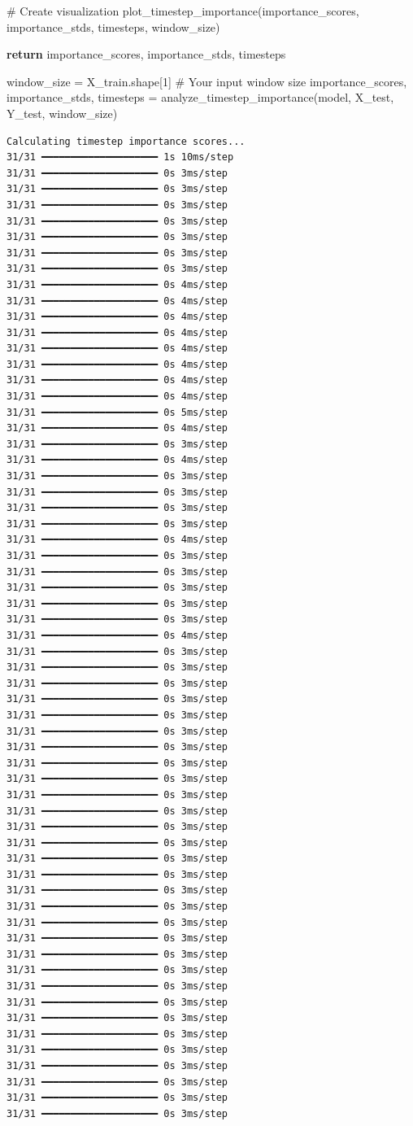 \documentclass[
  letterpaper,
  DIV=11,
  numbers=noendperiod]{scrreprt}
\newenvironment{Shaded}{\begin{snugshade}}{\end{snugshade}}
\newcommand{\CommentTok}[1]{\textcolor[rgb]{0.37,0.37,0.37}{#1}}
\newcommand{\ControlFlowTok}[1]{\textcolor[rgb]{0.00,0.23,0.31}{\textbf{#1}}}
\newcommand{\DecValTok}[1]{\textcolor[rgb]{0.68,0.00,0.00}{#1}}
\newcommand{\NormalTok}[1]{\textcolor[rgb]{0.00,0.23,0.31}{#1}}
\newcommand{\OperatorTok}[1]{\textcolor[rgb]{0.37,0.37,0.37}{#1}}
\begin{document}
\begin{Shaded}
\begin{Highlighting}[]
    \CommentTok{\# Create visualization}
\NormalTok{    plot\_timestep\_importance(importance\_scores, importance\_stds, timesteps, window\_size)}

    \ControlFlowTok{return}\NormalTok{ importance\_scores, importance\_stds, timesteps}

\NormalTok{window\_size }\OperatorTok{=}\NormalTok{ X\_train.shape[}\DecValTok{1}\NormalTok{]  }\CommentTok{\# Your input window size}
\NormalTok{importance\_scores, importance\_stds, timesteps }\OperatorTok{=}\NormalTok{ analyze\_timestep\_importance(model, X\_test, Y\_test, window\_size)}
\end{Highlighting}
\end{Shaded}

\begin{verbatim}
Calculating timestep importance scores...
31/31 ━━━━━━━━━━━━━━━━━━━━ 1s 10ms/step
31/31 ━━━━━━━━━━━━━━━━━━━━ 0s 3ms/step
31/31 ━━━━━━━━━━━━━━━━━━━━ 0s 3ms/step
31/31 ━━━━━━━━━━━━━━━━━━━━ 0s 3ms/step
31/31 ━━━━━━━━━━━━━━━━━━━━ 0s 3ms/step
31/31 ━━━━━━━━━━━━━━━━━━━━ 0s 3ms/step
31/31 ━━━━━━━━━━━━━━━━━━━━ 0s 3ms/step
31/31 ━━━━━━━━━━━━━━━━━━━━ 0s 3ms/step
31/31 ━━━━━━━━━━━━━━━━━━━━ 0s 4ms/step
31/31 ━━━━━━━━━━━━━━━━━━━━ 0s 4ms/step
31/31 ━━━━━━━━━━━━━━━━━━━━ 0s 4ms/step
31/31 ━━━━━━━━━━━━━━━━━━━━ 0s 4ms/step
31/31 ━━━━━━━━━━━━━━━━━━━━ 0s 4ms/step
31/31 ━━━━━━━━━━━━━━━━━━━━ 0s 4ms/step
31/31 ━━━━━━━━━━━━━━━━━━━━ 0s 4ms/step
31/31 ━━━━━━━━━━━━━━━━━━━━ 0s 4ms/step
31/31 ━━━━━━━━━━━━━━━━━━━━ 0s 5ms/step
31/31 ━━━━━━━━━━━━━━━━━━━━ 0s 4ms/step
31/31 ━━━━━━━━━━━━━━━━━━━━ 0s 3ms/step
31/31 ━━━━━━━━━━━━━━━━━━━━ 0s 4ms/step
31/31 ━━━━━━━━━━━━━━━━━━━━ 0s 3ms/step
31/31 ━━━━━━━━━━━━━━━━━━━━ 0s 3ms/step
31/31 ━━━━━━━━━━━━━━━━━━━━ 0s 3ms/step
31/31 ━━━━━━━━━━━━━━━━━━━━ 0s 3ms/step
31/31 ━━━━━━━━━━━━━━━━━━━━ 0s 4ms/step
31/31 ━━━━━━━━━━━━━━━━━━━━ 0s 3ms/step
31/31 ━━━━━━━━━━━━━━━━━━━━ 0s 3ms/step
31/31 ━━━━━━━━━━━━━━━━━━━━ 0s 3ms/step
31/31 ━━━━━━━━━━━━━━━━━━━━ 0s 3ms/step
31/31 ━━━━━━━━━━━━━━━━━━━━ 0s 3ms/step
31/31 ━━━━━━━━━━━━━━━━━━━━ 0s 4ms/step
31/31 ━━━━━━━━━━━━━━━━━━━━ 0s 3ms/step
31/31 ━━━━━━━━━━━━━━━━━━━━ 0s 3ms/step
31/31 ━━━━━━━━━━━━━━━━━━━━ 0s 3ms/step
31/31 ━━━━━━━━━━━━━━━━━━━━ 0s 3ms/step
31/31 ━━━━━━━━━━━━━━━━━━━━ 0s 3ms/step
31/31 ━━━━━━━━━━━━━━━━━━━━ 0s 3ms/step
31/31 ━━━━━━━━━━━━━━━━━━━━ 0s 3ms/step
31/31 ━━━━━━━━━━━━━━━━━━━━ 0s 3ms/step
31/31 ━━━━━━━━━━━━━━━━━━━━ 0s 3ms/step
31/31 ━━━━━━━━━━━━━━━━━━━━ 0s 3ms/step
31/31 ━━━━━━━━━━━━━━━━━━━━ 0s 3ms/step
31/31 ━━━━━━━━━━━━━━━━━━━━ 0s 3ms/step
31/31 ━━━━━━━━━━━━━━━━━━━━ 0s 3ms/step
31/31 ━━━━━━━━━━━━━━━━━━━━ 0s 3ms/step
31/31 ━━━━━━━━━━━━━━━━━━━━ 0s 3ms/step
31/31 ━━━━━━━━━━━━━━━━━━━━ 0s 3ms/step
31/31 ━━━━━━━━━━━━━━━━━━━━ 0s 3ms/step
31/31 ━━━━━━━━━━━━━━━━━━━━ 0s 3ms/step
31/31 ━━━━━━━━━━━━━━━━━━━━ 0s 3ms/step
31/31 ━━━━━━━━━━━━━━━━━━━━ 0s 3ms/step
31/31 ━━━━━━━━━━━━━━━━━━━━ 0s 3ms/step
31/31 ━━━━━━━━━━━━━━━━━━━━ 0s 3ms/step
31/31 ━━━━━━━━━━━━━━━━━━━━ 0s 3ms/step
31/31 ━━━━━━━━━━━━━━━━━━━━ 0s 3ms/step
31/31 ━━━━━━━━━━━━━━━━━━━━ 0s 3ms/step
31/31 ━━━━━━━━━━━━━━━━━━━━ 0s 3ms/step
31/31 ━━━━━━━━━━━━━━━━━━━━ 0s 3ms/step
31/31 ━━━━━━━━━━━━━━━━━━━━ 0s 3ms/step
31/31 ━━━━━━━━━━━━━━━━━━━━ 0s 3ms/step
31/31 ━━━━━━━━━━━━━━━━━━━━ 0s 3ms/step


\end{verbatim}
\end{document}
